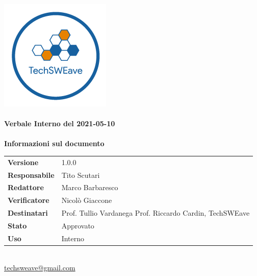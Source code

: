 \documentclass[a4paper]{article}
\begin{document}
\begin{titlepage}
    \begin{center}
        \includegraphics{../../../../Images/logo.png}\\
        \vspace{20px}
        \textcolor{logo}{\hrulefill}\\
        \vspace{20px}
        \textbf{\huge\textcolor{logo}{Verbale Interno del 2021-05-10}}\\
        \vspace{10px}
        \textcolor{logo}{\hrulefill}\\
        \vspace{40px}
        \textbf{\Large Informazioni sul documento}\\
        \vspace{20px}
        \begin{tabular}{p{100px} | p{100px}}
            \textbf{Versione}     & 1.0.0                                                                      \\
            \textbf{Responsabile} & Tito Scutari                                                               \\
            \textbf{Redattore}    & Marco Barbaresco                                                           \\
            \textbf{Verificatore} & Nicolò Giaccone                                                            \\
            \textbf{Destinatari}  & Prof. Tullio Vardanega \newline Prof. Riccardo Cardin, \newline TechSWEave \\
            \textbf{Stato}        & Approvato                                                                  \\
            \textbf{Uso}          & Interno                                                                    \\
        \end{tabular}\\
        \vspace{60px}
        \href{mailto:techsweave@gmail.com}{techsweave@gmail.com}\\

    \end{center}
\end{titlepage}
\end{document}
